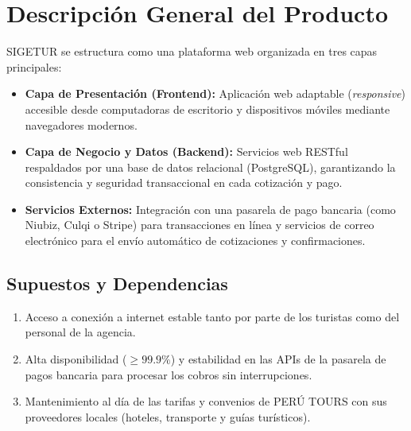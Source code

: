 \section{Descripción General del Producto}
SIGETUR se estructura como una plataforma web organizada en tres capas principales:
\begin{itemize}
    \item \textbf{Capa de Presentación (Frontend):} Aplicación web adaptable (\textit{responsive}) accesible desde computadoras de escritorio y dispositivos móviles mediante navegadores modernos.
    \item \textbf{Capa de Negocio y Datos (Backend):} Servicios web RESTful respaldados por una base de datos relacional (PostgreSQL), garantizando la consistencia y seguridad transaccional en cada cotización y pago.
    \item \textbf{Servicios Externos:} Integración con una pasarela de pago bancaria (como Niubiz, Culqi o Stripe) para transacciones en línea y servicios de correo electrónico para el envío automático de cotizaciones y confirmaciones.
\end{itemize}

\subsection{Supuestos y Dependencias}
\begin{enumerate}[noitemsep]
    \item Acceso a conexión a internet estable tanto por parte de los turistas como del personal de la agencia.
    \item Alta disponibilidad ($\ge 99.9\%$) y estabilidad en las APIs de la pasarela de pagos bancaria para procesar los cobros sin interrupciones.
    \item Mantenimiento al día de las tarifas y convenios de PERÚ TOURS con sus proveedores locales (hoteles, transporte y guías turísticos).
\end{enumerate}
